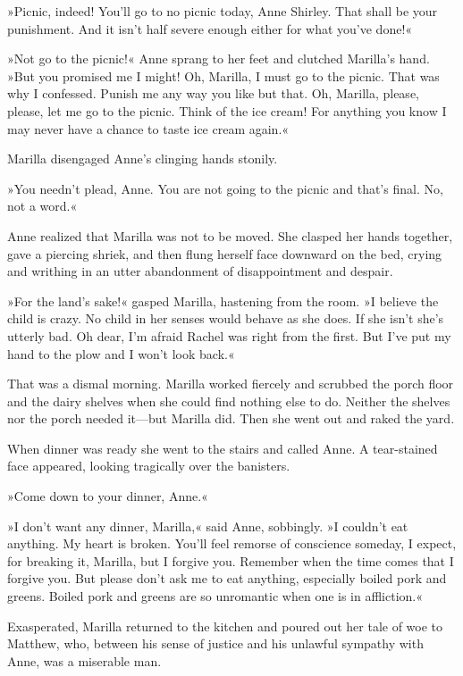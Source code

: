 »Picnic, indeed! You'll go to no picnic today, Anne Shirley. That shall be your punishment. And it isn't half severe enough either for what you've done!«

»Not go to the picnic!« Anne sprang to her feet and clutched Marilla's hand. »But you promised me I might! Oh, Marilla, I must go to the picnic. That was why I confessed. Punish me any way you like but that. Oh, Marilla, please, please, let me go to the picnic. Think of the ice cream! For anything you know I may never have a chance to taste ice cream again.«

Marilla disengaged Anne's clinging hands stonily.

»You needn't plead, Anne. You are not going to the picnic and that's final. No, not a word.«

Anne realized that Marilla was not to be moved. She clasped her hands together, gave a piercing shriek, and then flung herself face downward on the bed, crying and writhing in an utter abandonment of disappointment and despair.

»For the land's sake!« gasped Marilla, hastening from the room. »I believe the child is crazy. No child in her senses would behave as she does. If she isn't she's utterly bad. Oh dear, I'm afraid Rachel was right from the first. But I've put my hand to the plow and I won't look back.«

That was a dismal morning. Marilla worked fiercely and scrubbed the porch floor and the dairy shelves when she could find nothing else to do. Neither the shelves nor the porch needed it—but Marilla did. Then she went out and raked the yard.

When dinner was ready she went to the stairs and called Anne. A tear-stained face appeared, looking tragically over the banisters.

»Come down to your dinner, Anne.«

»I don't want any dinner, Marilla,« said Anne, sobbingly. »I couldn't eat anything. My heart is broken. You'll feel remorse of conscience someday, I expect, for breaking it, Marilla, but I forgive you. Remember when the time comes that I forgive you. But please don't ask me to eat anything, especially boiled pork and greens. Boiled pork and greens are so unromantic when one is in affliction.«

Exasperated, Marilla returned to the kitchen and poured out her tale of woe to Matthew, who, between his sense of justice and his unlawful sympathy with Anne, was a miserable man.

